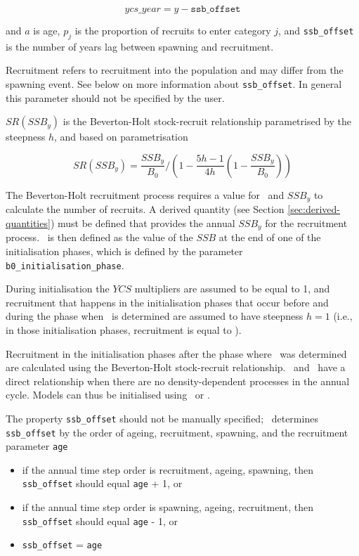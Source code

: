 \begin{equation}\label{eq:year_class}
ycs\_year = y - \texttt{ssb\_offset}
\end{equation}

and $a$ is age, $p_j$ is the proportion of recruits to enter category $j$, and \texttt{ssb\_offset} is the number of years lag between spawning and recruitment.

Recruitment refers to recruitment into the population and may differ from the spawning event. See below on more information about \texttt{ssb\_offset}. In general this parameter should not be specified by the user.

$SR(SSB_y)$ is the Beverton-Holt stock-recruit relationship parametrised by the steepness $h$, and based on \cite{mace_doonan_88} parametrisation

\begin{equation}\label{eq:BH_SR}
SR(SSB_y) = \frac{SSB_y}{B_0} / \left( 1-\frac{5h-1}{4h} \left( 1-\frac{SSB_y}{B_0} \right) \right)
\end{equation}

The Beverton-Holt recruitment process requires a value for \Bzero\ and $SSB_y$ to calculate the number of recruits. A derived quantity (see Section \ref{sec:derived-quantities}) must be defined that provides the annual $SSB_y$ for the recruitment process. \Bzero\ is then defined as the value of the $SSB$ at the end of one of the initialisation phases, which is defined by the parameter \texttt{b0\_initialisation\_phase}.

During initialisation the $YCS$ multipliers are assumed to be equal to 1, and recruitment that happens in the initialisation phases that occur before and during the phase when \Bzero\ is determined are assumed to have steepness $h=1$ (i.e., in those initialisation phases, recruitment is equal to \Rzero).

Recruitment in the initialisation phases after the phase where \Bzero\ was determined are calculated using the Beverton-Holt stock-recruit relationship. \Rzero\ and \Bzero\ have a direct relationship when there are no density-dependent processes in the annual cycle. Models can thus be initialised using \Bzero\ or \Rzero.

The property \texttt{ssb\_offset} should not be manually specified; \CNAME\ determines \texttt{ssb\_offset} by the order of ageing, recruitment, spawning, and the recruitment parameter \texttt{age}

\begin{itemize}
	\item if the annual time step order is recruitment, ageing, spawning, then \texttt{ssb\_offset} should equal \texttt{age} + 1, or
	\item if the annual time step order is spawning, ageing, recruitment, then \texttt{ssb\_offset} should equal \texttt{age} - 1, or
	\item \texttt{ssb\_offset} = \texttt{age}
\end{itemize}

